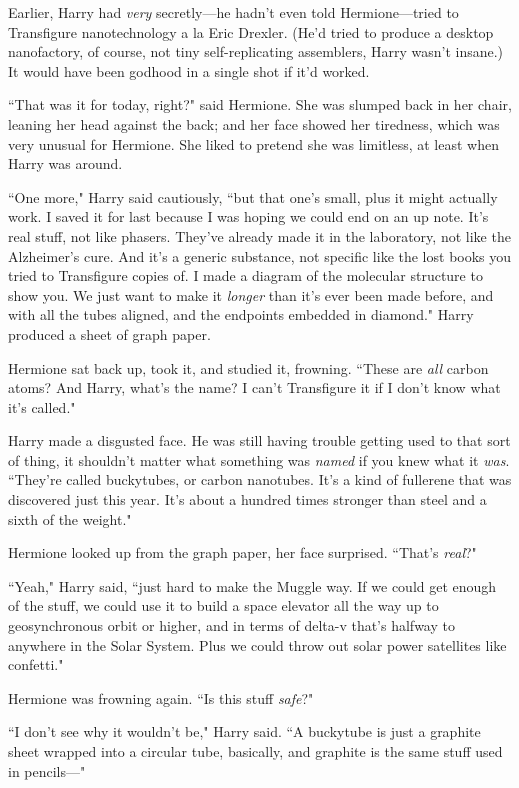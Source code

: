 Earlier, Harry had \emph{very} secretly—he hadn't even told Hermione—tried to Transfigure nanotechnology a la Eric Drexler. (He'd tried to produce a desktop nanofactory, of course, not tiny self-replicating assemblers, Harry wasn't insane.) It would have been godhood in a single shot if it'd worked.

``That was it for today, right?" said Hermione. She was slumped back in her chair, leaning her head against the back; and her face showed her tiredness, which was very unusual for Hermione. She liked to pretend she was limitless, at least when Harry was around.

``One more," Harry said cautiously, ``but that one's small, plus it might actually work. I saved it for last because I was hoping we could end on an up note. It's real stuff, not like phasers. They've already made it in the laboratory, not like the Alzheimer's cure. And it's a generic substance, not specific like the lost books you tried to Transfigure copies of. I made a diagram of the molecular structure to show you. We just want to make it \emph{longer} than it's ever been made before, and with all the tubes aligned, and the endpoints embedded in diamond." Harry produced a sheet of graph paper.

Hermione sat back up, took it, and studied it, frowning. ``These are \emph{all} carbon atoms? And Harry, what's the name? I can't Transfigure it if I don't know what it's called."

Harry made a disgusted face. He was still having trouble getting used to that sort of thing, it shouldn't matter what something was \emph{named} if you knew what it \emph{was}. ``They're called buckytubes, or carbon nanotubes. It's a kind of fullerene that was discovered just this year. It's about a hundred times stronger than steel and a sixth of the weight."

Hermione looked up from the graph paper, her face surprised. ``That's \emph{real}?"

``Yeah," Harry said, ``just hard to make the Muggle way. If we could get enough of the stuff, we could use it to build a space elevator all the way up to geosynchronous orbit or higher, and in terms of delta-v that's halfway to anywhere in the Solar System. Plus we could throw out solar power satellites like confetti."

Hermione was frowning again. ``Is this stuff \emph{safe}?"

``I don't see why it wouldn't be," Harry said. ``A buckytube is just a graphite sheet wrapped into a circular tube, basically, and graphite is the same stuff used in pencils—"

